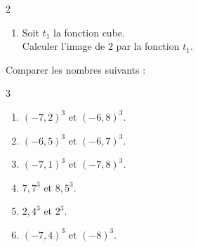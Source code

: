 {\begin{Exercice}
\begin{multicols}{2}
\begin{enumerate}[itemsep=1em]
\begin{minipage}[t]{\linewidth}
      Calculer $s_1(-1)$.\end{minipage}
	\item \begin{minipage}[t]{\linewidth}Soit $t_1$ la fonction cube.\\
      
      Calculer l'image de $2$ par la fonction $t_1$.\end{minipage}
\end{enumerate}
\end{multicols}
\end{Exercice}

\begin{Exercice}%
Comparer les nombres suivants :
\begin{multicols}{3}
\begin{enumerate}[itemsep=1.5em]
	\item \begin{minipage}[t]{\linewidth}$(-7{,}2)^3$ et $(-6{,}8)^3$.\end{minipage}
	\item \begin{minipage}[t]{\linewidth}$(-6{,}5)^3$ et $(-6{,}7)^3$.\end{minipage}
	\item \begin{minipage}[t]{\linewidth}$(-7{,}1)^3$ et $(-7{,}8)^3$.\end{minipage}
	\item \begin{minipage}[t]{\linewidth}$7{,}7^3$ et $8{,}5^3$.\end{minipage}
	\item \begin{minipage}[t]{\linewidth}$2{,}4^3$ et $2^3$.\end{minipage}
	\item \begin{minipage}[t]{\linewidth}$(-7{,}4)^3$ et $(-8)^3$.\end{minipage}
\end{enumerate}
\end{multicols}
\end{Exercice}

}
